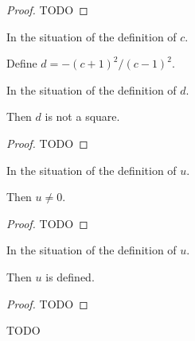 \begin{proof}
  \leanok
  TODO
\end{proof}

\begin{definition}
  \label{def:Elligator1.d}
  \leanok
  In the situation of the definition of $c$.

  Define $d = - (c + 1)^2 / (c - 1)^2$.
\end{definition}

\begin{theorem}[d nonsquare]
  \label{thm:Elligator1.d_nonsquare}
  \leanok
  In the situation of the definition of $d$.

  Then $d$ is not a square.
\end{theorem}

\begin{proof}
  \leanok
  TODO
\end{proof}


\begin{theorem}[u nonzero]
  \label{thm:Elligator1.u_ne_zero}
  \leanok
  In the situation of the definition of $u$.

  Then $u $.
\end{theorem}

\begin{proof}
  \leanok
  TODO
\end{proof}

\begin{theorem}[u defined]
  \label{thm:Elligator1.u_defined}
  In the situation of the definition of $u$.

  Then $u$ is defined.
\end{theorem}

\begin{proof}
  \leanok
  TODO
\end{proof}

\begin{definition}
  \label{def:Elligator1.v}
  \leanok
  TODO
\end{definition}

